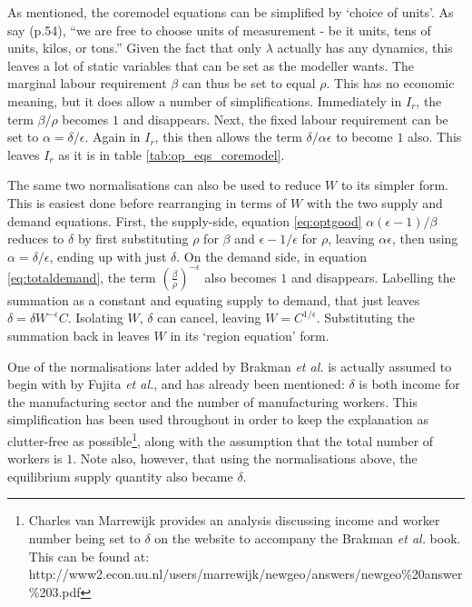 {As mentioned, the \gls{coremodel} equations can be simplified by `choice of units'. As \citealt{fujita_spatial_2001} say (p.54), ``we are free to choose units of measurement - be it units, tens of units, kilos, or tons.'' Given the fact that only $\lambda$ actually has any dynamics, this leaves a lot of static variables that can be set as the modeller wants. The marginal labour requirement $\beta$ can thus be set to equal $\rho$. This has no economic meaning, but it does allow a number of simplifications. Immediately in $I_{r}$, the term $\beta/\rho$ becomes $1$ and disappears. Next, the fixed labour requirement can be set to $\alpha = \delta/\epsilon$. Again in $I_{r}$, this then allows the term $\delta/\alpha \epsilon$ to become $1$ also. This leaves $I_{r}$ as it is in table \ref{tab:op_eqs_coremodel}. 

The same two normalisations can also be used to reduce $W$ to its simpler form. This is easiest done before rearranging in terms of $W$ with the two supply and demand equations. First, the supply-side, equation \eqref{eq:optgood} $\alpha(\epsilon - 1)/\beta$ reduces to $\delta$ by first substituting $\rho$ for $\beta$ and $\epsilon-1/\epsilon$ for $\rho$, leaving $\alpha \epsilon$, then using $\alpha = \delta/\epsilon$, ending up with just $\delta$.  On the demand side, in equation \eqref{eq:totaldemand}, the term $\left(\frac{\beta}{\rho}\right)^{-\epsilon}$ also becomes $1$ and disappears. Labelling the summation as a constant and equating supply to demand, that just leaves $\delta = \delta W^{-\epsilon} C$. Isolating $W$, $\delta$ can cancel, leaving $W = C^{1/\epsilon}$. Substituting the summation back in leaves $W$ in its `region equation' form. 

One of the normalisations later added by Brakman \emph{et al.} is actually assumed to begin with by Fujita \emph{et al.}, and has already been mentioned: $\delta$ is both income for the manufacturing sector and the number of manufacturing workers. This simplification has been used throughout in order to keep the explanation as clutter-free as possible\footnote{Charles van Marrewijk provides an analysis discussing income and worker number being set to $\delta$ on the website to accompany the Brakman \emph{et al.} book. This can be found at: http://www2.econ.uu.nl/users/marrewijk/newgeo/answers/newgeo\%20answer\%203.pdf}, along with the assumption that the total number of workers is $1$. Note also, however, that using the normalisations above, the equilibrium supply quantity also became $\delta$. 

}
